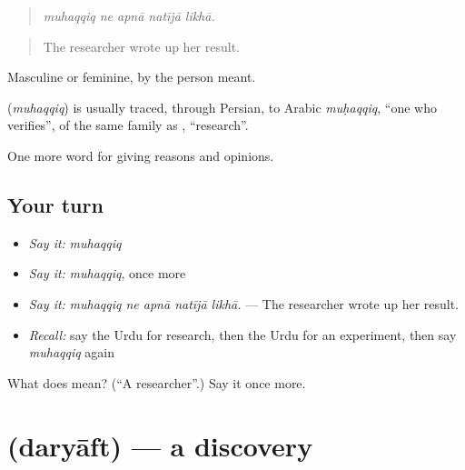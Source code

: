 \begin{quote}
    
\end{quote}

\begin{quote}
\emph{muhaqqiq ne apnā natījā likhā.}
\end{quote}

\begin{quote}
The researcher wrote up her result.
\end{quote}

Masculine or feminine, by the person meant.

\begin{cousinweb}
\textbf{} (\emph{muhaqqiq}) is usually traced, through Persian, to Arabic \emph{muḥaqqiq}, \textquotedblleft{}one who verifies\textquotedblright{}, of the same family as \textbf{}, \textquotedblleft{}research\textquotedblright{}.
\end{cousinweb}

\begin{grammarlens}[title={What you've built}]
One more word for giving reasons and opinions.
\end{grammarlens}

\subsection*{Your turn}
\begin{itemize}
\raggedright
  \item \emph{Say it:} \emph{muhaqqiq}
  \item \emph{Say it:} \emph{muhaqqiq}, once more
  \item \emph{Say it:} \emph{muhaqqiq ne apnā natījā likhā.} — The researcher wrote up her result.
  \item \emph{Recall:} say the Urdu for research, then the Urdu for an experiment, then say \emph{muhaqqiq} again
\end{itemize}

\begin{tcolorbox}[breakable,colback=teal!4,colframe=teal!35!black,title={Before you move on}]
What does  mean? (\textquotedblleft{}A researcher\textquotedblright{}.) Say it once more.
\end{tcolorbox}
\section[\texorpdfstring{\ur{دریافت} (daryāft)}{دریافت (daryāft)}]{ (daryāft) — a discovery}

